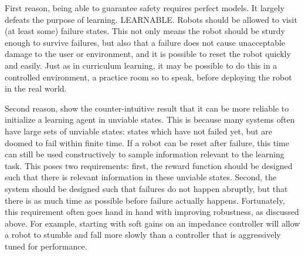 First reason, being able to guarantee safety requires perfect models. It largely defeats the purpose of learning. LEARNABLE. Robots should be allowed to visit (at least some) failure states. This not only means the robot should be sturdy enough to survive failures, but also that a failure does not cause unacceptable damage to the user or environment, and it is possible to reset the robot quickly and easily. Just as in curriculum learning, it may be possible to do this in a controlled environment, a practice room so to speak, before deploying the robot in the real world. \par

Second reason, \textcite{heim2018unviable} show the counter-intuitive result that it can be more reliable to initialize a learning agent in unviable states. This is because many systems often have large sets of unviable states: states which have not failed yet, but are doomed to fail within finite time.
If a robot can be reset after failure, this time can still be used constructively to sample information relevant to the learning task. This poses two requirements: first, the reward function should be designed such that there is relevant information in these unviable states. Second, the system should be designed such that failures do not happen abruptly, but that there is as much time as possible before failure actually happens. Fortunately, this requirement often goes hand in hand with improving robustness, as discussed above. For example, starting with soft gains on an impedance controller will allow a robot to stumble and fall more slowly than a controller that is aggressively tuned for performance.


